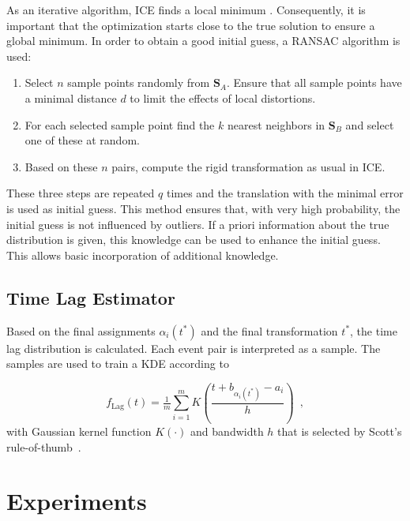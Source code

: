 \documentclass[conference]{IEEEtran}
\theoremstyle{examplestyle}
\begin{document}
As an iterative algorithm, \ac{ICE} finds a local minimum \cite{Do2008}. Consequently, it is important that the optimization starts close to the true solution to ensure a global minimum. In order to obtain a good initial guess, a \ac{RANSAC} \cite{Fischler1981} algorithm is used:
\begin{enumerate}
	\item Select \(n\) sample points randomly from \(\pmb{S}_A\). Ensure that all sample points have a minimal distance \(d\) to limit the effects of local distortions.
	\item For each selected sample point find the \(k\) nearest neighbors in \(\pmb{S}_B\) and select one of these at random.
	\item Based on these \(n\) pairs, compute the rigid transformation as usual in \ac{ICE}.
\end{enumerate}

These three steps are repeated \(q\) times and the translation with the minimal error is used as initial guess. This method ensures that, with very high probability, the initial guess is not influenced by outliers. If a priori information about the true distribution is given, this knowledge can be used to enhance the initial guess. This allows basic incorporation of additional knowledge.


\subsection{Time Lag Estimator} \label{sec:labestimator}
Based on the final assignments $\alpha_i(t^*)$ and the final transformation $t^*$, the time lag distribution is calculated. Each event pair is interpreted as a sample. The samples are used to train a \ac{KDE} according to

\begin{equation}
	\label{eq:solutionICP}
 f_{\text{Lag}}(t) = \tfrac{1}{m} \sum_{i=1}^m K\left( \frac{t+ b_{\alpha_i(t^*)} - a_i }{ h} \right) \enspace ,
	\end{equation}
with Gaussian kernel function $K(\cdot)$ and bandwidth $h$ that is selected by Scott's rule-of-thumb~\cite{Scott1992}.











\section{Experiments} \label{sec:exp}
\end{document}

